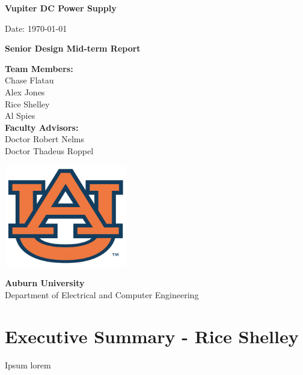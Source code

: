 \documentclass[15pt]{article}
\begin{document}
\begin{titlepage}
    \begin{singlespace}
    \begin{center}
        \vspace*{1cm}
            
        \Huge
        \textbf{Vupiter DC Power Supply}
            
        \vspace{0.5cm}
        \large
        Date: \today
            
        \vspace{2.25cm}

        \textbf{Senior Design Mid-term Report}
        
        \vspace{2.25cm}

        \textbf{Team Members:}\\
        Chase Flatau\\
        Alex Jones\\
        Rice Shelley\\
        Al Spies\\
        \textbf{Faculty Advisors:}\\
        Doctor Robert Nelms\\
        Doctor Thadeus Roppel
        \vfill
            
            
        \vspace{0.8cm}
            
        \includegraphics[width=0.4\textwidth]{university}
            
        \Large

        \textbf{Auburn University}\\
        Department of Electrical and Computer Engineering\\

            
    \end{center}
\end{singlespace}
\end{titlepage}
\section{Executive Summary - Rice Shelley}
Ipsum lorem
\end{document}
